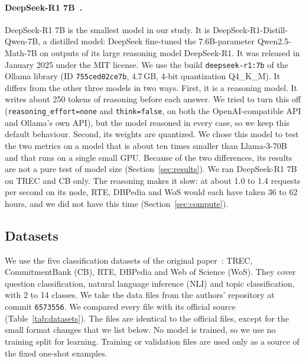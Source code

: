 \paragraph{DeepSeek-R1 7B~\cite{deepseek-r1-7b-ollama}.}
DeepSeek-R1 7B is the smallest model in our study. It is
DeepSeek-R1-Distill-Qwen-7B, a distilled model: DeepSeek fine-tuned the
7.6B-parameter Qwen2.5-Math-7B on outputs of its large reasoning model
DeepSeek-R1. It was released in January 2025 under the MIT license.
We use the build \texttt{deepseek-r1:7b} of the Ollama library (ID
\texttt{755ced02ce7b}, 4.7\,GB, 4-bit quantization Q4\_K\_M). It differs from
the other three models in two ways. First, it is a reasoning model. It writes
about 250 tokens of reasoning before each answer. We tried to turn this off
(\texttt{reasoning\_effort=none} and \texttt{think=false}, on both the
OpenAI-compatible API and Ollama's own API), but the model reasoned in every
case, so we keep this default behaviour. Second, its weights are quantized. We chose this model to test the
two metrics on a model that is about ten times smaller than Llama-3-70B and
that runs on a single small GPU. Because of the two differences, its results
are not a pure test of model size (Section~\ref{sec:results}).
We ran DeepSeek-R1 7B on TREC and CB only. The reasoning makes it slow: at
about 1.0 to 1.4 requests per second on its node, RTE, DBPedia and WoS would
each have taken 36 to 62 hours, and we did not have this time
(Section~\ref{sec:compute}).

\subsection{Datasets}
\label{sec:datasets}

We use the five classification datasets of the original
paper~\cite{Errica:2025}: TREC, CommitmentBank (CB), RTE, DBPedia and Web of
Science (WoS). They cover question classification, natural language inference
(NLI) and topic classification, with 2 to 14 classes. We take the data files
from the authors' repository at commit \texttt{6573556}. We compared every file
with its official source (Table~\ref{tab:datasets}). The files are identical to
the official files, except for the small format changes that we list below.
No model is trained, so we use no training split for learning. Training or
validation files are used only as a source of the fixed one-shot examples.

